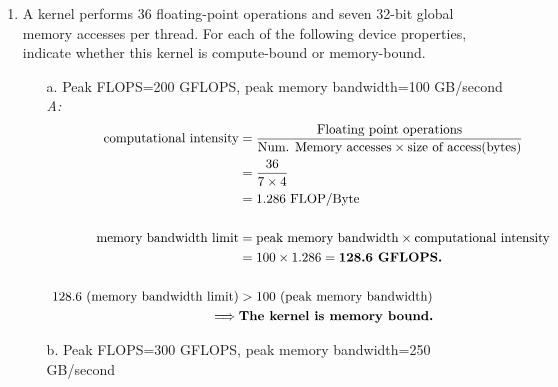 \begin{enumerate}
    \item A kernel performs 36 floating-point operations and seven 32-bit global memory accesses per thread. For each of the following device properties, indicate whether this kernel is compute-bound or memory-bound.
          \begin{itemize}
              \item[ a.] Peak FLOPS=200 GFLOPS, peak memory bandwidth=100 GB/second
                    \\ \textsl{A:}
                    \begin{equation*}
                        \begin{aligned}
                            \text{computational intensity}         & = \frac{\text{Floating point operations} }{\text{Num. Memory accesses} \times  \text{\text{size of access(bytes)}}} \\
                                                                   & = \frac{36}{7\times4}                                                                                               \\
                                                                   & = 1.286 \text{ FLOP/Byte}                                                                                           \\\\
                            \text{memory bandwidth limit}          & = \text{peak memory bandwidth}                 \times \text{computational intensity}                                \\
                                                                   & = 100 \times 1.286 = \textbf{128.6 GFLOPS.}                                                                         \\\\
                            \text{ 128.6 (memory bandwidth limit)} & > \text{100 (peak memory bandwidth)}                                                                                \\
                            \implies                               & \textbf{The kernel is memory bound.}                                                                                \\
                        \end{aligned}
                    \end{equation*}
              \item[ b.] Peak FLOPS=300 GFLOPS, peak memory bandwidth=250 GB/second

\end{itemize}
\end{enumerate}
